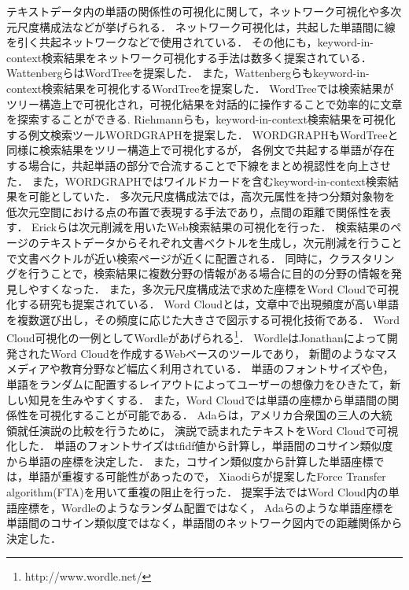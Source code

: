 \documentclass[syuuron]{kuee}
\begin{document}
		テキストデータ内の単語の関係性の可視化に関して，ネットワーク可視化や多次元尺度構成法などが挙げられる．
		ネットワーク可視化は，共起した単語間に線を引く共起ネットワークなどで使用されている．
		その他にも，keyword-in-context検索結果をネットワーク可視化する手法は数多く提案されている．
		WattenbergらはWordTreeを提案した\cite{wt1}．
		また，Wattenbergらもkeyword-in-context検索結果を可視化するWordTreeを提案した\cite{wt1}．
		WordTreeでは検索結果がツリー構造上で可視化され，可視化結果を対話的に操作することで効率的に文章を探索することができる.
		Riehmannらも，keyword-in-context検索結果を可視化する例文検索ツールWORDGRAPHを提案した\cite{wg1}．
		WORDGRAPHもWordTreeと同様に検索結果をツリー構造上で可視化するが，
		各例文で共起する単語が存在する場合に，共起単語の部分で合流することで下線をまとめ視認性を向上させた．
		また，WORDGRAPHではワイルドカードを含むkeyword-in-context検索結果を可能としていた．		
		多次元尺度構成法では，高次元属性を持つ分類対象物を低次元空間における点の布置で表現する手法であり，点間の距離で関係性を表す．
		Erickらは次元削減を用いたWeb検索結果の可視化を行った\cite{or1}．
		検索結果のページのテキストデータからそれぞれ文書ベクトルを生成し，次元削減を行うことで文書ベクトルが近い検索ページが近くに配置される．
		同時に，クラスタリングを行うことで，検索結果に複数分野の情報がある場合に目的の分野の情報を発見しやすくなった．
		また，多次元尺度構成法で求めた座標をWord Cloudで可視化する研究も提案されている．
		Word Cloudとは，文章中で出現頻度が高い単語を複数選び出し，その頻度に応じた大きさで図示する可視化技術である\cite{wc1}．
		Word Cloud可視化の一例としてWordleがあげられる\footnote{http://www.wordle.net/}．
		WordleはJonathanによって開発されたWord Cloudを作成するWebベースのツールであり，
		新聞のようなマスメディアや教育分野など幅広く利用されている\cite{wc2}．
		単語のフォントサイズや色，単語をランダムに配置するレイアウトによってユーザーの想像力をひきたて，新しい知見を生みやすくする．
		また，Word Cloudでは単語の座標から単語間の関係性を可視化することが可能である．
		Adaらは，アメリカ合衆国の三人の大統領就任演説の比較を行うために，
		演説で読まれたテキストをWord Cloudで可視化した\cite{fta2}．
		単語のフォントサイズはtfidf値から計算し，単語間のコサイン類似度から単語の座標を決定した．
		また，コサイン類似度から計算した単語座標では，単語が重複する可能性があったので，
		Xiaodiらが提案したForce Transfer algorithm(FTA)を用いて重複の阻止を行った\cite{fta1}．
		提案手法ではWord Cloud内の単語座標を，Wordleのようなランダム配置ではなく，
		Adaらのような単語座標を単語間のコサイン類似度ではなく，単語間のネットワーク図内での距離関係から決定した．
\end{document}
